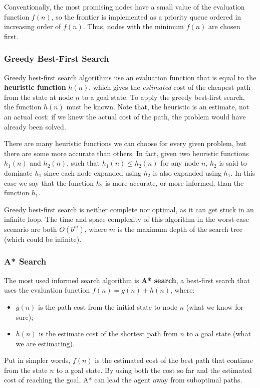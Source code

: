 \documentclass{article}
\begin{document}
Conventionally, the most promising nodes have a small value of the evaluation function $f(n)$, so the frontier is implemented as a priority queue ordered in increasing order of $f(n)$. Thus, nodes with the minimum $f(n)$ are chosen first.

\subsubsection{Greedy Best-First Search}
Greedy best-first search algorithms use an evaluation function that is equal to the \textbf{heuristic function} $h(n)$, which gives the \textit{estimated} cost of the cheapest path from the state at node $n$ to a goal state. To apply the greedy best-first search, the function $h(n)$ must be known. Note that, the heuristic is an estimate, not an actual cost: if we knew the actual cost of the path, the problem would have already been solved.

There are many heuristic functions we can choose for every given problem, but there are some more accurate than others. In fact, given two heuristic functions $h_1(n)$ and $h_2(n)$, such that $h_1(n)\le h_2(n)$ for any node $n$, $h_2$ is said to dominate $h_1$ since each node expanded using $h_2$ is also expanded using $h_1$. In this case we say that the function $h_2$ is more accurate, or more informed, than the function $h_1$.

Greedy best-first search is neither complete nor optimal, as it can get stuck in an infinite loop. The time and space complexity of this algorithm in the worst-case scenario are both $O(b^m)$, where $m$ is the maximum depth of the search tree (which could be infinite).

\subsubsection{A* Search}
The most used informed search algorithm is \textbf{A* search}, a best-first search that uses the evaluation function $f(n) = g(n) + h(n)$, where:
\begin{itemize}
    \item $g(n)$ is the path cost from the initial state to node $n$ (what we know for sure);
    \item $h(n)$ is the estimate cost of the shortest path from $n$ to a goal state (what we are estimating).
\end{itemize}
Put in simpler words, $f(n)$ is the estimated cost of the best path that continue from the state $n$ to a goal state. By using both the cost so far and the estimated cost of reaching the goal, A* can lead the agent away from suboptimal paths.
\end{document}
